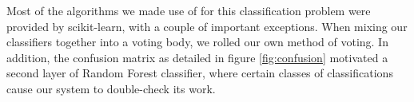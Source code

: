 Most of the algorithms we made use of for this classification problem 
were provided by scikit-learn, with a couple of important exceptions.  
When mixing our classifiers together into a voting body, we rolled our 
own method of voting.  In addition, the confusion matrix as detailed in 
figure \ref{fig:confusion} motivated a second layer of Random Forest 
classifier, where certain classes of classifications cause our system to 
double-check its work.  


